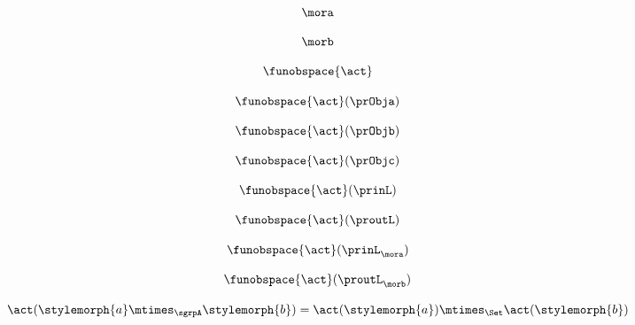 \begin{forslides}
    \begin{equation}
        \label{eq:slides-processes-55}
        \mora
    \end{equation}

    \begin{equation}
        \label{eq:slides-processes-56}
        \morb
    \end{equation}

    \begin{equation}
        \label{eq:slides-processes-57}
         \funobspace{\act}
    \end{equation}

    \begin{equation}
        \label{eq:slides-processes-58}
        \funobspace{\act} (\prObja)
    \end{equation}

    \begin{equation}
        \label{eq:slides-processes-59}
        \funobspace{\act} (\prObjb)
    \end{equation}

    \begin{equation}
        \label{eq:slides-processes-60}
        \funobspace{\act} (\prObjc)
    \end{equation}

    \begin{equation}
        \label{eq:slides-processes-61}
        \funobspace{\act} (\prinL)
    \end{equation}

    \begin{equation}
        \label{eq:slides-processes-62}
        \funobspace{\act} (\proutL)
    \end{equation}

    \begin{equation}
        \label{eq:slides-processes-63}
        \funobspace{\act} (\prinL_\mora)
    \end{equation}

    \begin{equation}
        \label{eq:slides-processes-64}
        \funobspace{\act} (\proutL_\morb)
    \end{equation}

    \begin{equation}
        \label{eq:slides-processes-65}
         \act ( \stylemorph{a} \mtimes_\sgrpA  \stylemorph{b} ) =  \act (\stylemorph{a}) \mtimes_\Set  \act(\stylemorph{b})
    \end{equation}


\end{forslides}
